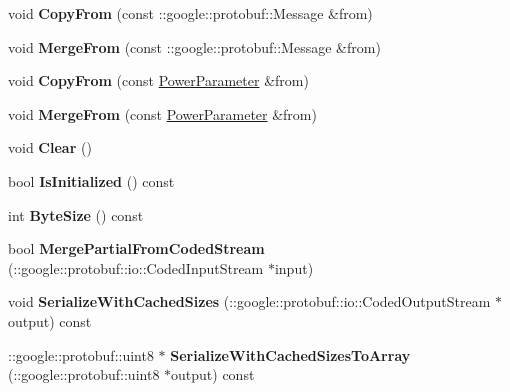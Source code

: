 \begin{DoxyCompactItemize}
void {\bfseries Copy\+From} (const \+::google\+::protobuf\+::\+Message \&from)
\item 
\mbox{\label{classcaffe_1_1_power_parameter_a963ccb77ab83f80f374a455bee969f5a}} 
void {\bfseries Merge\+From} (const \+::google\+::protobuf\+::\+Message \&from)
\item 
\mbox{\label{classcaffe_1_1_power_parameter_a9ffd6f85b7143d6ad75a43f980d35e50}} 
void {\bfseries Copy\+From} (const \mbox{\hyperlink{classcaffe_1_1_power_parameter}{Power\+Parameter}} \&from)
\item 
\mbox{\label{classcaffe_1_1_power_parameter_ad3cc912445bf3fa37601c587cf4e1b9d}} 
void {\bfseries Merge\+From} (const \mbox{\hyperlink{classcaffe_1_1_power_parameter}{Power\+Parameter}} \&from)
\item 
\mbox{\label{classcaffe_1_1_power_parameter_af8f5a49d411b97cebb6633c49544c52f}} 
void {\bfseries Clear} ()
\item 
\mbox{\label{classcaffe_1_1_power_parameter_ad549c1d142b2d0a8b6c1f68ece301b03}} 
bool {\bfseries Is\+Initialized} () const
\item 
\mbox{\label{classcaffe_1_1_power_parameter_adc0b891edd2fdfa8e6d9822beb9f1c93}} 
int {\bfseries Byte\+Size} () const
\item 
\mbox{\label{classcaffe_1_1_power_parameter_a48203e73454f0096b723c6cd005b2bc2}} 
bool {\bfseries Merge\+Partial\+From\+Coded\+Stream} (\+::google\+::protobuf\+::io\+::\+Coded\+Input\+Stream $\ast$input)
\item 
\mbox{\label{classcaffe_1_1_power_parameter_ab23f6083edf5d971ebf0eb6a778910ba}} 
void {\bfseries Serialize\+With\+Cached\+Sizes} (\+::google\+::protobuf\+::io\+::\+Coded\+Output\+Stream $\ast$output) const
\item 
\mbox{\label{classcaffe_1_1_power_parameter_a4550f76c6cb31ee62d035955facb8d5f}} 
\+::google\+::protobuf\+::uint8 $\ast$ {\bfseries Serialize\+With\+Cached\+Sizes\+To\+Array} (\+::google\+::protobuf\+::uint8 $\ast$output) const

\end{DoxyCompactItemize}

